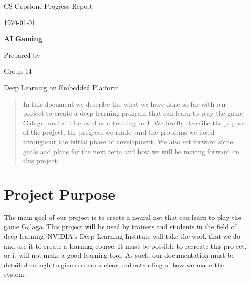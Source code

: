 \documentclass[onecolumn, draftclsnofoot,10pt, compsoc]{IEEEtran}
\def \CapstoneTeamName{		Deep Learning on Embedded Platform}
\def \CapstoneTeamNumber{		14}
\def \CapstoneProjectName{		AI Gaming}
\def \DocType{	%
				Progress Report
				}
\begin{document}
\begin{titlepage}
    \begin{singlespace}
        \hfill
        \par\vspace{.2in}
        \centering
        \scshape{
            \huge CS Capstone \DocType \par
            {\large\today}\par
            \vspace{.5in}
            \textbf{\Huge\CapstoneProjectName}\par
            {\large Prepared by }\par
            Group\CapstoneTeamNumber\par
            \CapstoneTeamName\par
            \vspace{5pt}
        }
        \begin{abstract}
        In this document we describe the what we have done so far with our project to create a deep learning program that can learn to play the game Galaga, and will be used as a training tool.
	We breifly describe the pupose of the project, the progress we made, and the problems we faced throughout the initial phase of development.
	We also set forward some goals and plans for the next term and how we will be moving forward on this project.

        \end{abstract}
    \end{singlespace}
\end{titlepage}

\newpage
{}
\tableofcontents

\section{Project Purpose}
The main goal of our project is to create a neural net that can learn to play the game Galaga.
This project will be used by trainers and students in the field of deep learning.
NVIDIA's Deep Learning Institute will take the work that we do and use it to create a learning course.
It must be possible to recreate this project, or it will not make a good learning tool.
As such, our documentation must be detailed enough to give readers a clear understanding of how we made the system.
\end{document}
